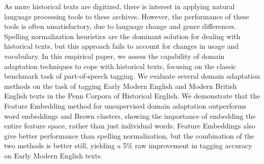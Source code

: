 As more historical texts are digitized, there is interest in applying natural language processing tools to these archives. However, the performance of these tools is often unsatisfactory, due to language change and genre differences. Spelling normalization heuristics are the dominant solution for dealing with historical texts, but this approach fails to account for changes in usage and vocabulary. In this empirical paper, we assess the capability of domain adaptation techniques to cope with historical texts, focusing on the classic benchmark task of part-of-speech tagging. We evaluate several domain adaptation methods on the task of tagging Early Modern English and Modern British English texts in the Penn Corpora of Historical English. We demonstrate that the Feature Embedding method for unsupervised domain adaptation outperforms word embeddings and Brown clusters, showing the importance of embedding the entire feature space, rather than just individual words. Feature Embeddings also give better performance than spelling normalization, but the combination of the two methods is better still, yielding a 5\% raw improvement in tagging accuracy on Early Modern English texts.
